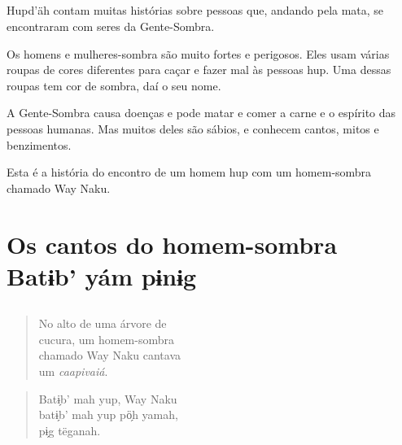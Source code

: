\chapter*{}
\thispagestyle{empty}

\vspace*{\fill}
 Hupd'äh contam muitas histórias sobre pessoas que, andando pela mata, se
encontraram com seres da Gente-Sombra.

Os homens e mulheres-sombra são muito fortes e perigosos. Eles usam várias roupas de cores diferentes para caçar e fazer mal às pessoas hup. Uma dessas roupas tem cor de sombra,
daí o seu nome.

A Gente-Sombra causa doenças e pode matar e comer a carne e o espírito das pessoas humanas. Mas muitos deles são sábios, e conhecem cantos, mitos e benzimentos.

Esta é a história do encontro de um homem hup com um homem-sombra chamado Way Naku.
\vspace*{\fill}

\openany

\blankpage
\part[Os cantos do homem-sombra]{Os cantos do homem-sombra\\Batɨ\´b’ yám pɨnɨ\´g}


\chapter*{}

\mbox{}\vspace*{\fill}

\begin{verse}
No alto de uma árvore de\\
cucura, um homem-sombra\\
chamado Way Naku cantava\\
um \textit{caapivaiá}.
\end{verse}

\begin{verse}
Batɨ̗b’ mah yup, Way Naku\\
batɨ̗b’ mah yup pö̗h yamah,\\
pɨ̗g tëganah.
\end{verse}

\vspace*{\fill}

\blankpage

\chapter*{}

